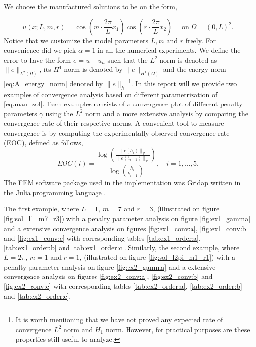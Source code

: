 We choose the manufactured solutions to be on the form,

\begin{equation}
    \label{eq:man_sol}
u\left( x; L,m,r \right) = \cos\left(  m\cdot \frac{2\pi}{L}  x_{1}\right)  \cos \left(r\cdot  \frac{2\pi}{L} x_{2} \right) \quad \text{ on }   \Omega =  \left( 0,L  \right)^{2}.
\end{equation}
Notice that we customize the model parameters $L, m \text{ and } r$ freely.
For convenience did we pick $\alpha = 1$ in all the numerical experiments. We define the error to have the form $e = u - u_{h}$ such that the $L^2$ norm is denoted as $\| e \|_{ L^{2}\left( \Omega  \right)   }^{  } $, its $H^{1} $ norm is denoted by $\|
e \|_{ H^{1}\left( \Omega  \right)  }^{  } $ and the energy norm  \eqref{eq:A_energy_norm} denoted by $\| e \|_{ h }^{  } $ \footnote{
It is worth mentioning that we have not proved any expected rate of convergence $L^2$ norm and $H_1$ norm. However, for practical purposes are these properties still useful to analyze.
}. In this report will we provide two examples of convergence analysis based on different
parametrization of \eqref{eq:man_sol}. Each examples consists of a convergence plot of different penalty parameters $\gamma$ using the $L^{2}$ norm and a more extensive analysis by comparing the convergence rate of their respective norms. A convenient tool to measure convergence is by computing the experimentally observed convergence rate (EOC), defined as follows,
\[
EOC(i) = \frac{\log\left( \frac{\| e\left( h_{i} \right)  \|_{ \mathcal{V}  }^{  }}{\| e\left( h_{i-1} \right) \|_{\mathcal{V}   }^{  } }   \right)}{\log\left( \frac{h_{i}}{h_{i-1}}  \right) }, \quad i = 1,\ldots,5.
\]
The FEM software package used in the implementation was Gridap written in the Julia programming language \cite{verdugo22, julia17}.

The first example, where $L=1$, $m=7$ and $r=3$, (illustrated on figure \ref{fig:sol_l1_m7_r3}) with a penalty parameter analysis on figure \ref{fig:ex1_gamma} and a extensive convergence analysis on figures \ref{fig:ex1_conv:a}, \ref{fig:ex1_conv:b} and \ref{fig:ex1_conv:c} with
corresponding tables \ref{tab:ex1_order:a}, \ref{tab:ex1_order:b} and \ref{tab:ex1_order:c}. Similarly, the second example, where $L=2\pi$, $m=1$ and $r=1$, (illustrated on figure \ref{fig:sol_l2pi_m1_r1}) with a penalty parameter analysis on figure
\ref{fig:ex2_gamma} and a extensive convergence analysis on figures \ref{fig:ex2_conv:a},
\ref{fig:ex2_conv:b} and \ref{fig:ex2_conv:c} with corresponding tables \ref{tab:ex2_order:a}, \ref{tab:ex2_order:b} and \ref{tab:ex2_order:c}.

